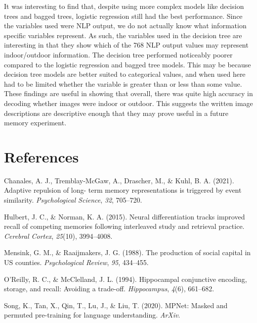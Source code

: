 \documentclass[
  english,
  man]{apa6}
\newlength{\cslhangindent}
\newlength{\cslentryspacingunit} %
\newenvironment{CSLReferences}[2] %
 {%
  \setlength{\parindent}{0pt}
  \ifodd #1
  \let\oldpar\par
  \def\par{\hangindent=\cslhangindent\oldpar}
  \fi
  \setlength{\parskip}{#2\cslentryspacingunit}
 }%
 {}
\begin{document}
It was interesting to find that, despite using more complex models like decision trees and bagged trees, logistic regression still had the best performance. Since the variables used were NLP output, we do not actually know what information specific variables represent. As such, the variables used in the decision tree are interesting in that they show which of the 768 NLP output values may represent indoor/outdoor information.
The decision tree performed noticeably poorer compared to the logistic regression and bagged tree models. This may be because decision tree models are better suited to categorical values, and when used here had to be limited whether the variable is greater than or less than some value.
These findings are useful in showing that overall, there was quite high accuracy in decoding whether images were indoor or outdoor. This suggests the written image descriptions are descriptive enough that they may prove useful in a future memory experiment.

\newpage

\hypertarget{references}{%
\section{References}\label{references}}

\begingroup
\setlength{\parindent}{-0.5in}
\setlength{\leftskip}{0.5in}

\hypertarget{refs}{}
\begin{CSLReferences}{1}{0}
\leavevmode{}%
Chanales, A. J., Tremblay-McGaw, A., Drascher, M., \& Kuhl, B. A. (2021). Adaptive repulsion of long- term memory representations is triggered by event similarity. \emph{Psychological Science}, \emph{32}, 705--720.

\leavevmode{}%
Hulbert, J. C., \& Norman, K. A. (2015). Neural differentiation tracks improved recall of competing memories following interleaved study and retrieval practice. \emph{Cerebral Cortex}, \emph{25}(10), 3994--4008.

\leavevmode{}%
Mensink, G. M., \& Raaijmakers, J. G. (1988). The production of social capital in US counties. \emph{Psychological Review}, \emph{95}, 434--455.

\leavevmode{}%
O'Reilly, R. C., \& McClelland, J. L. (1994). Hippocampal conjunctive encoding, storage, and recall: Avoiding a trade-off. \emph{Hippocampus}, \emph{4}(6), 661--682.

\leavevmode{}%
Song, K., Tan, X., Qin, T., Lu, J., \& Liu, T. (2020). MPNet: Masked and permuted pre-training for language understanding. \emph{ArXiv}.

\end{CSLReferences}

\endgroup
\end{document}
